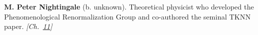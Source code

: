 \textbf{M. Peter Nightingale} (b. unknown). Theoretical physicist who developed the Phenomenological Renormalization Group and co-authored the seminal TKNN paper. \emph{[Ch.~\hyperref[ch:topologicalinsulators]{11}]}

